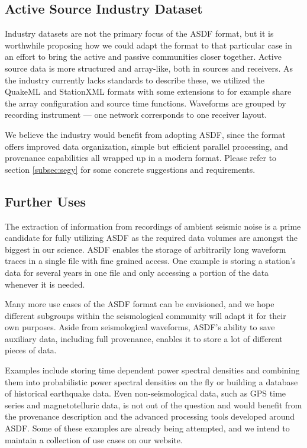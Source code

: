 \subsection{Active Source Industry Dataset}

Industry datasets are not the primary focus of the ASDF format, but it is
worthwhile proposing how we could adapt the format to that particular case in
an effort to bring the active and passive communities closer together. Active
source data is more structured and array-like, both in sources and receivers.
As the industry currently lacks standards to describe these, we utilized the
QuakeML and StationXML formats with some extensions to for example share the
array configuration and source time functions. Waveforms are grouped by
recording instrument --- one network corresponds to one receiver layout.

We believe the industry would benefit from adopting ASDF, since the format
offers improved data organization, simple but efficient parallel processing,
and provenance capabilities all wrapped up in a modern format.
Please refer to section \ref{subsec:segy} for some concrete suggestions and
requirements.


\subsection{Further Uses}

The extraction of information from recordings of ambient seismic noise is a
prime candidate for fully utilizing ASDF as the required data volumes are
amongst the biggest in our science. ASDF enables the storage of arbitrarily
long waveform traces in a single file with fine grained access.  One example is
storing a station's data for several years in one file and only accessing a
portion of the data whenever it is needed.

Many more use cases of the ASDF format can be envisioned, and we hope different
subgroups within the seismological community will adapt it for their own
purposes. Aside from seismological waveforms, ASDF's ability to save auxiliary
data, including full provenance, enables it to store a lot of different pieces
of data.

Examples include storing time dependent power spectral densities and combining
them into probabilistic power spectral densities on the fly
\cite{McNamara2004} or building a database of historical earthquake
data.  Even non-seismological data, such as GPS time series and magnetotelluric
data, is not out of the question and would benefit from the provenance
description and the advanced processing tools developed around ASDF. Some of
these examples are already being attempted, and we intend to maintain a
collection of use cases on our website.
